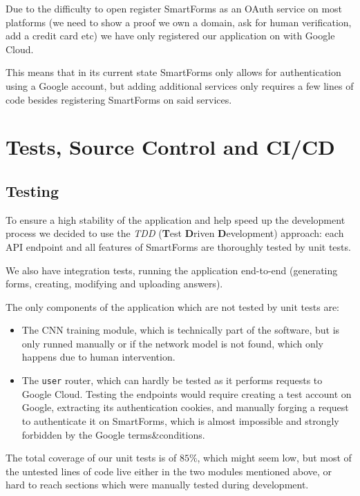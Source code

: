 \documentclass[11pt, a4paper]{report}
\def\code#1{\texttt{#1}}
\begin{document}
Due to the difficulty to open register SmartForms as an OAuth service on most platforms (we need to show a proof we own a domain, ask for human verification, add a credit card etc) we have only registered our application on with Google Cloud.

This means that in its current state SmartForms only allows for authentication using a Google account, but adding additional services only requires a few lines of code besides registering SmartForms on said services.


\chapter{Tests, Source Control and CI/CD}

\section{Testing}

To ensure a high stability of the application and help speed up the development process we decided to use the \textit{TDD} (\textbf{T}est \textbf{D}riven \textbf{D}evelopment) approach: each API endpoint and all features of SmartForms are thoroughly tested by unit tests.

We also have integration tests, running the application end-to-end (generating forms, creating, modifying and uploading answers).

The only components of the application which are not tested by unit tests are:
\begin{itemize}
	\item The CNN training module, which is technically part of the software, but is only runned manually or if the network model is not found, which only happens due to human intervention.
	\item The \code{user} router, which can hardly be tested as it performs requests to Google Cloud. Testing the endpoints would require creating a test account on Google, extracting its authentication cookies, and manually forging a request to authenticate it on SmartForms, which is almost impossible and strongly forbidden by the Google terms\&conditions. 
\end{itemize}

The total coverage of our unit tests is of $85\%$, which might seem low, but most of the untested lines of code live either in the two modules mentioned above, or hard to reach sections which were manually tested during development.
\end{document}
